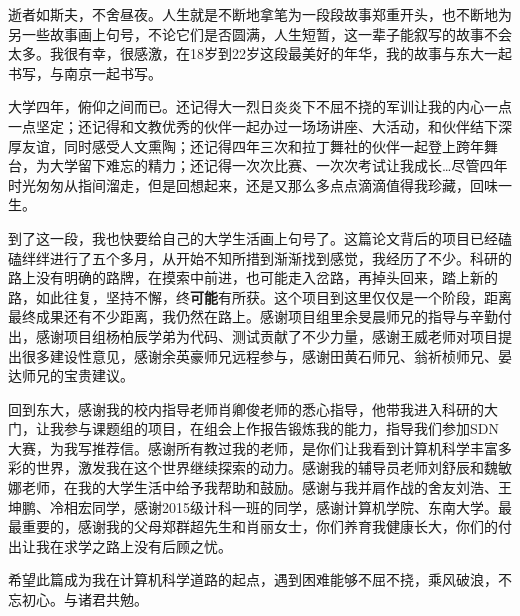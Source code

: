 \begin{Acknowledgement}{}
    \par 逝者如斯夫，不舍昼夜。人生就是不断地拿笔为一段段故事郑重开头，也不断地为另一些故事画上句号，不论它们是否圆满，人生短暂，这一辈子能叙写的故事不会太多。我很有幸，很感激，在18岁到22岁这段最美好的年华，我的故事与东大一起书写，与南京一起书写。

    \par 大学四年，俯仰之间而已。还记得大一烈日炎炎下不屈不挠的军训让我的内心一点一点坚定；还记得和文教优秀的伙伴一起办过一场场讲座、大活动，和伙伴结下深厚友谊，同时感受人文熏陶；还记得四年三次和拉丁舞社的伙伴一起登上跨年舞台，为大学留下难忘的精力；还记得一次次比赛、一次次考试让我成长\ldots 尽管四年时光匆匆从指间溜走，但是回想起来，还是又那么多点点滴滴值得我珍藏，回味一生。

    \par 到了这一段，我也快要给自己的大学生活画上句号了。这篇论文背后的项目已经磕磕绊绊进行了五个多月，从开始不知所措到渐渐找到感觉，我经历了不少。科研的路上没有明确的路牌，在摸索中前进，也可能走入岔路，再掉头回来，踏上新的路，如此往复，坚持不懈，终\textbf{可能}有所获。这个项目到这里仅仅是一个阶段，距离最终成果还有不少距离，我仍然在路上。感谢项目组里余旻晨师兄的指导与辛勤付出，感谢项目组杨柏辰学弟为代码、测试贡献了不少力量，感谢王威老师对项目提出很多建设性意见，感谢余英豪师兄远程参与，感谢田黄石师兄、翁祈桢师兄、晏达师兄的宝贵建议。

    \par 回到东大，感谢我的校内指导老师肖卿俊老师的悉心指导，他带我进入科研的大门，让我参与课题组的项目，在组会上作报告锻炼我的能力，指导我们参加SDN大赛，为我写推荐信。感谢所有教过我的老师，是你们让我看到计算机科学丰富多彩的世界，激发我在这个世界继续探索的动力。感谢我的辅导员老师刘舒辰和魏敏娜老师，在我的大学生活中给予我帮助和鼓励。感谢与我并肩作战的舍友刘浩、王坤鹏、冷相宏同学，感谢2015级计科一班的同学，感谢计算机学院、东南大学。最最重要的，感谢我的父母郑群超先生和肖丽女士，你们养育我健康长大，你们的付出让我在求学之路上没有后顾之忧。

    \par 希望此篇成为我在计算机科学道路的起点，遇到困难能够不屈不挠，乘风破浪，不忘初心。与诸君共勉。

\end{Acknowledgement}
